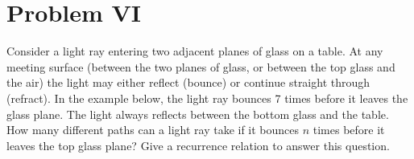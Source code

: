 \section{Problem VI}
Consider a light ray entering two adjacent planes of glass on a table. At any meeting surface (between the two planes of glass, or between the top glass and the air) the light may either reflect (bounce) or continue straight through (refract). In the example below, the light ray bounces 7 times before it leaves the glass plane. The light always reflects between the bottom glass and the table. How many different paths can a light ray take if it bounces $n$ times before it leaves the top glass plane? Give a recurrence relation to answer this question.